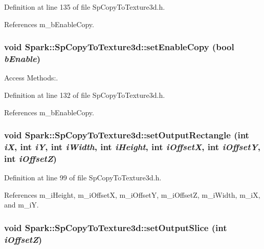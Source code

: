Definition at line 135 of file Sp\-Copy\-To\-Texture3d.h.

References m\_\-b\-Enable\-Copy.
\subsubsection{\setlength{\rightskip}{0pt plus 5cm}void Spark::Sp\-Copy\-To\-Texture3d::set\-Enable\-Copy (bool {\em b\-Enable})\hspace{0.3cm}{\tt  [inline]}}\label{classSpark_1_1SpCopyToTexture3d_a8}


Access Methods:. 

Definition at line 132 of file Sp\-Copy\-To\-Texture3d.h.

References m\_\-b\-Enable\-Copy.
\subsubsection{\setlength{\rightskip}{0pt plus 5cm}void Spark::Sp\-Copy\-To\-Texture3d::set\-Output\-Rectangle (int {\em i\-X}, int {\em i\-Y}, int {\em i\-Width}, int {\em i\-Height}, int {\em i\-Offset\-X}, int {\em i\-Offset\-Y}, int {\em i\-Offset\-Z})\hspace{0.3cm}{\tt  [inline]}}\label{classSpark_1_1SpCopyToTexture3d_a4}


Definition at line 99 of file Sp\-Copy\-To\-Texture3d.h.

References m\_\-i\-Height, m\_\-i\-Offset\-X, m\_\-i\-Offset\-Y, m\_\-i\-Offset\-Z, m\_\-i\-Width, m\_\-i\-X, and m\_\-i\-Y.
\subsubsection{\setlength{\rightskip}{0pt plus 5cm}void Spark::Sp\-Copy\-To\-Texture3d::set\-Output\-Slice (int {\em i\-Offset\-Z})\hspace{0.3cm}{\tt  [inline]}}\label{classSpark_1_1SpCopyToTexture3d_a5}


